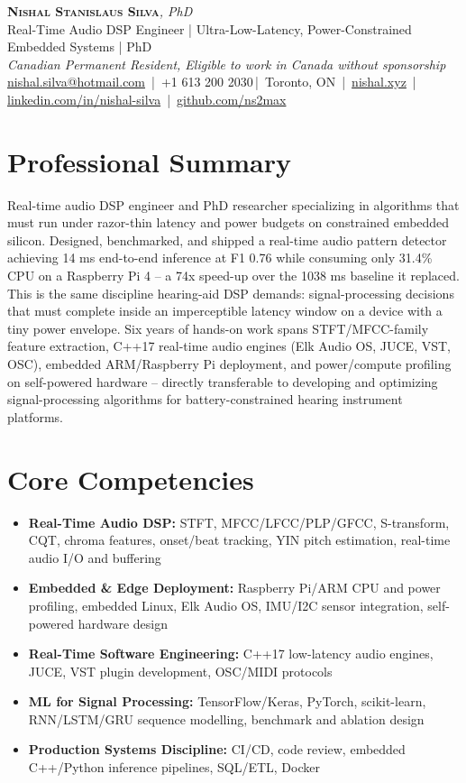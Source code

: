 \documentclass[11pt]{article}
\makeatletter
\newcommand{\cvName}{Nishal Stanislaus Silva}
\newcommand{\cvEmail}{nishal.silva@hotmail.com}
\newcommand{\cvPhone}{+1 613 200 2030}
\newcommand{\cvCity}{Toronto, ON}
\newcommand{\cvSite}{https://nishal.xyz}
\newcommand{\cvLinkedIn}{https://www.linkedin.com/in/nishal-silva}
\newcommand{\cvGitHub}{https://github.com/ns2max}
\newcommand{\cvStatus}{Canadian Permanent Resident, Eligible to work in Canada without sponsorship}
\newcommand{\cvTagline}{Real-Time Audio DSP Engineer | Ultra-Low-Latency, Power-Constrained Embedded Systems | PhD}
\makeatother
\begin{document}
\pagestyle{empty}
\begin{center}
    {\LARGE \scshape \textbf{\cvName}}{\large \textit{, PhD}}\\[1pt]
    {\small \cvTagline}\\[1pt]
    {\footnotesize\textit{\cvStatus}}\\[1pt]
    {\small
    \href{mailto:\cvEmail}{\cvEmail} \,|\, \cvPhone \,|\, \cvCity
    \,|\, \href{\cvSite}{nishal.xyz} \,|\, \href{\cvLinkedIn}{linkedin.com/in/nishal-silva}
    \,|\, \href{\cvGitHub}{github.com/ns2max}}
\end{center}

\section*{Professional Summary}
Real-time audio DSP engineer and PhD researcher specializing in algorithms that must run under razor-thin latency and power budgets on constrained embedded silicon. Designed, benchmarked, and shipped a real-time audio pattern detector achieving 14 ms end-to-end inference at F1 0.76 while consuming only 31.4\% CPU on a Raspberry Pi 4 -- a 74x speed-up over the 1038 ms baseline it replaced. This is the same discipline hearing-aid DSP demands: signal-processing decisions that must complete inside an imperceptible latency window on a device with a tiny power envelope. Six years of hands-on work spans STFT/MFCC-family feature extraction, C++17 real-time audio engines (Elk Audio OS, JUCE, VST, OSC), embedded ARM/Raspberry Pi deployment, and power/compute profiling on self-powered hardware -- directly transferable to developing and optimizing signal-processing algorithms for battery-constrained hearing instrument platforms.

\section*{Core Competencies}
\begin{itemize}[leftmargin=1.5em, itemsep=-0.2em]
    \item \textbf{Real-Time Audio DSP:} STFT, MFCC/LFCC/PLP/GFCC, S-transform, CQT, chroma features, onset/beat tracking, YIN pitch estimation, real-time audio I/O and buffering
    \item \textbf{Embedded \& Edge Deployment:} Raspberry Pi/ARM CPU and power profiling, embedded Linux, Elk Audio OS, IMU/I2C sensor integration, self-powered hardware design
    \item \textbf{Real-Time Software Engineering:} C++17 low-latency audio engines, JUCE, VST plugin development, OSC/MIDI protocols
    \item \textbf{ML for Signal Processing:} TensorFlow/Keras, PyTorch, scikit-learn, RNN/LSTM/GRU sequence modelling, benchmark and ablation design
    \item \textbf{Production Systems Discipline:} CI/CD, code review, embedded C++/Python inference pipelines, SQL/ETL, Docker
\end{itemize}
\end{document}
